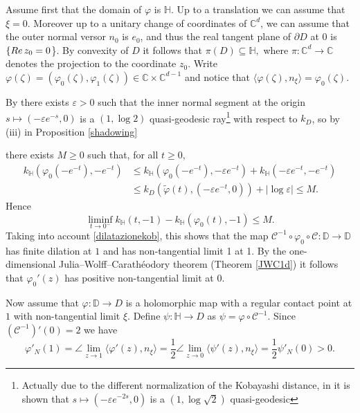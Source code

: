 \documentclass[11pt, reqno]{amsart}
\numberwithin{equation}{section}
\theoremstyle{definition}
\newcommand{\C}{\mathbb{C}}
\newcommand{\D}{\mathbb{D}}
\renewcommand{\H}{\mathbb{H}}
\begin{document}
	\proof
	Assume first that the domain of $\varphi$ is $\H$.
	Up to a translation we can assume that $\xi=0$. Moreover up to a unitary change of coordinates of $\C^d$, we can assume that the outer normal versor $n_0$ is $e_0$, and thus the real tangent plane of $\partial D$ at $0$ is $\{{\rm Re}\,z_0=0$\}.
	By convexity of $D$ it follows that $\pi(D)\subseteq\H,$ where
	$\pi\colon\C^d\to\C$ denotes the projection to the coordinate $z_0$. Write $\varphi(\zeta)=(\varphi_0(\zeta),\varphi_1(\zeta))\in\C\times\C^{d-1}$ and notice that $\langle \varphi(\zeta),n_\xi\rangle=\varphi_0(\zeta)$. 
	
	
	
	By \cite[Proposition 11.1]{Zim} there exists $\varepsilon>0$ such that the inner normal segment at the origin $s\mapsto(-\varepsilon e^{-s},0)$ is a $(1,\log 2)$ quasi-geodesic ray\footnote{Actually due to the different normalization of the Kobayashi distance, in \cite[Proposition 11.1]{Zim} it is shown that   $s\mapsto(-\varepsilon e^{-2s},0)$ is a $(1,\log \sqrt 2)$ quasi-geodesic} with respect to $k_D$, so by (iii) in Proposition \ref{shadowing} {there exists $M\geq 0$ such that, for all $t\geq 0$,
		\begin{align*}k_\H(\varphi_0(-e^{-t}),-e^{-t})&\leq k_\H(\varphi_0(-e^{-t}),-\varepsilon e^{-t})+k_\H(-\varepsilon e^{-t},-e^{-t})\\&\leq k_D(\tilde\varphi(t),(-\varepsilon e^{-t},0))+|\log\varepsilon|\leq M.\end{align*} 
		Hence $$\liminf_{t\to0^-}k_\H(t,-1)-k_\H(\varphi_0(t),-1)\leq M.$$
		Taking into account \eqref{dilatazionekob}, this shows that the map $\mathscr{C}^{-1}\circ \varphi_0\circ\mathscr{C}\colon \D\to \D$ has finite dilation at $1$ and has non-tangential limit 1 at 1. 
		By   the one-dimensional Julia--Wolff--Carath\'eodory theorem (Theorem \ref{JWC1d})   it follows that  $\varphi_0'(z)$ has positive non-tangential limit at $0$.
		
		
		
		Now assume that $\varphi\colon \D\to D$ is a holomorphic map with a regular contact point at $1$ with non-tangential limit $\xi$.
		Define
		$\psi\colon \H\to D$  as
		$\psi=\varphi\circ \mathscr{C}^{-1}$. Since $(\mathscr{C}^{-1})'(0)=2$ we have
		\begin{equation}\label{changenormal}
			\varphi'_N(1)=\angle\lim_{z\to 1} \langle \varphi'(z),n_\xi\rangle=\frac{1}{2}\angle\lim_{z\to 0} \langle \psi'(z),n_\xi\rangle=\frac{1}{2}\psi'_N(0)>0.
		\end{equation}
		
}
\end{document}
